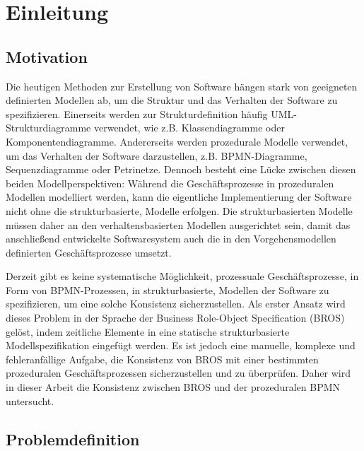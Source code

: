 \chapter{Einleitung}
\label{chap:introduction}

\section{Motivation}

Die heutigen Methoden zur Erstellung von Software hängen stark von geeigneten definierten Modellen ab, um die Struktur und das Verhalten der Software zu spezifizieren.
Einerseits werden zur Strukturdefinition häufig UML-Strukturdiagramme verwendet, wie z.B. Klassendiagramme oder Komponentendiagramme.
Andererseits werden prozedurale Modelle verwendet, um das Verhalten der Software darzustellen, z.B. BPMN-Diagramme, Sequenzdiagramme oder Petrinetze.
Dennoch besteht eine Lücke zwischen diesen beiden Modellperspektiven: Während die Geschäftsprozesse in prozeduralen Modellen modelliert werden, kann die eigentliche Implementierung der Software nicht ohne die strukturbasierte, Modelle erfolgen.
Die strukturbasierten Modelle müssen daher an den verhaltensbasierten Modellen ausgerichtet sein, damit das anschließend entwickelte Softwaresystem auch die in den Vorgehensmodellen definierten Geschäftsprozesse umsetzt.

Derzeit gibt es keine systematische Möglichkeit, prozessuale Geschäftsprozesse, in Form von BPMN-Prozessen, in strukturbasierte, Modellen der Software zu spezifizieren, um eine solche Konsistenz sicherzustellen.
Als erster Ansatz wird dieses Problem in der Sprache der Business Role-Object Specification (BROS) gelöst, indem zeitliche Elemente in eine statische strukturbasierte Modellspezifikation eingefügt werden.
Es ist jedoch eine manuelle, komplexe und fehleranfällige Aufgabe, die Konsistenz von BROS mit einer bestimmten prozeduralen Geschäftsprozessen sicherzustellen und zu überprüfen.
Daher wird in dieser Arbeit die Konsistenz zwischen BROS und der prozeduralen BPMN untersucht.

\section{Problemdefinition}

